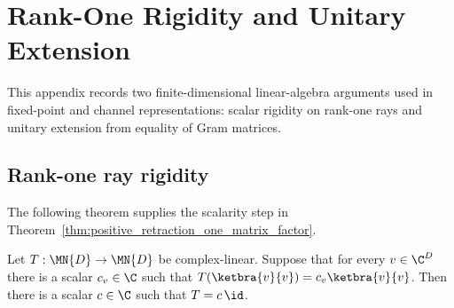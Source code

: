 \chapter{Rank-One Rigidity and Unitary Extension}
\label{ch:rankone_rigidity_unitary_extension}

This appendix records two finite-dimensional linear-algebra arguments used in
fixed-point and channel representations: scalar rigidity on rank-one rays and
unitary extension from equality of Gram matrices.

\section{Rank-one ray rigidity}

The following theorem supplies the scalarity step in
Theorem~\ref{thm:positive_retraction_one_matrix_factor}.

\begin{theorem}
    \label{thm:rankone_ray_scalar_rigidity}
    \leanok
    Let $T:\MN{D}\to\MN{D}$ be complex-linear. Suppose that for every
    $v\in\C^D$ there is a scalar $c_v\in\C$ such that
    $T(\ketbra{v}{v})=c_v\ketbra{v}{v}$.
    Then there is a scalar $c\in\C$ such that $T=c\,\id$.
\end{theorem}

